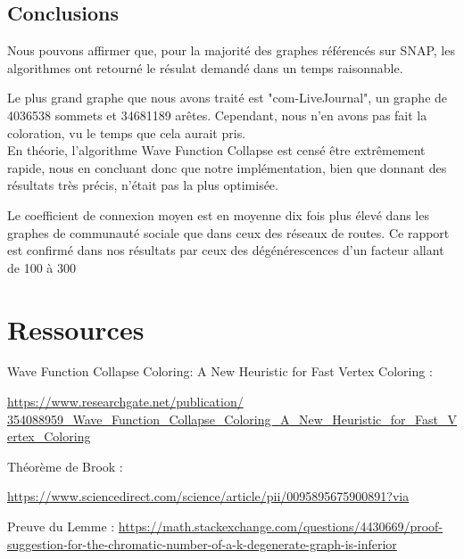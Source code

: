 \newpage

\subsection{Conclusions }

Nous pouvons affirmer que, pour la majorité des graphes référencés sur SNAP, les algorithmes ont retourné le résulat demandé dans un temps raisonnable.


Le plus grand graphe que nous avons traité est "com-LiveJournal", un graphe de 4036538 sommets et 34681189 arêtes. Cependant, nous n'en avons pas fait la coloration, vu le temps que cela aurait pris. \\
En théorie, l'algorithme Wave Function Collapse est censé être extrêmement rapide, nous en concluant donc que notre implémentation, bien que donnant des résultats très précis, n'était pas la plus optimisée.

Le coefficient de connexion moyen est en moyenne dix fois plus élevé dans les graphes de communauté sociale que dans ceux des réseaux de routes. Ce rapport est confirmé dans nos résultats par ceux des dégénérescences d'un facteur allant de 100 à 300



\newpage



\section{Ressources}

Wave Function Collapse Coloring: A New Heuristic for Fast Vertex Coloring :

\href{https://www.researchgate.net/publication/354088959_Wave_Function_Collapse_Coloring_A_New_Heuristic_for_Fast_Vertex_Coloring}{https://www.researchgate.net/publication/\\354088959_Wave_Function_Collapse_Coloring_A_New_Heuristic_for_Fast_Vertex_Coloring}

Théorème de Brook :

\href{https://www.sciencedirect.com/science/article/pii/0095895675900891?via%3Dihub}{https://www.sciencedirect.com/science/article/pii/0095895675900891?via%
}

Preuve du Lemme : \href{https://math.stackexchange.com/questions/4430669/proof-suggestion-for-the-chromatic-number-of-a-k-degenerate-graph-is-inferior}{https://math.stackexchange.com/questions/4430669/proof-suggestion-for-the-chromatic-number-of-a-k-degenerate-graph-is-inferior}

